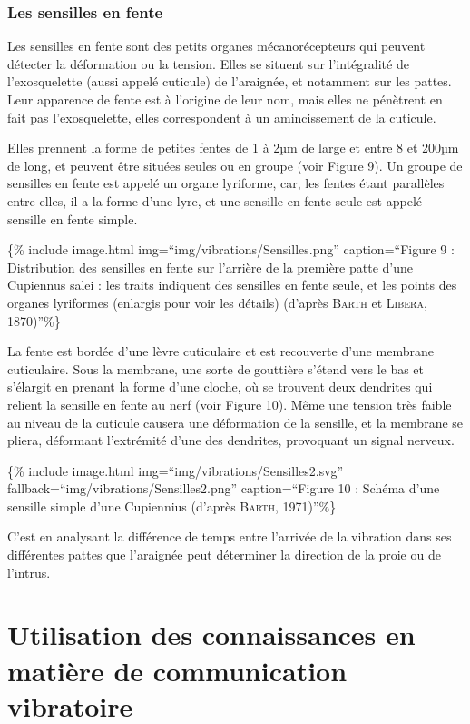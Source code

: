 \subsubsection{Les sensilles en fente}\label{les-sensilles-en-fente}

Les sensilles en fente sont des petits organes mécanorécepteurs qui
peuvent détecter la déformation ou la tension. Elles se situent sur
l'intégralité de l'exosquelette (aussi appelé cuticule) de l'araignée,
et notamment sur les pattes. Leur apparence de fente est à l'origine de
leur nom, mais elles ne pénètrent en fait pas l'exosquelette, elles
correspondent à un amincissement de la cuticule.

Elles prennent la forme de petites fentes de 1 à 2µm de large et entre 8
et 200µm de long, et peuvent être situées seules ou en groupe (voir
Figure 9). Un groupe de sensilles en fente est appelé un organe
lyriforme, car, les fentes étant parallèles entre elles, il a la forme
d'une lyre, et une sensille en fente seule est appelé sensille en fente
simple.

\{\% include image.html img=``img/vibrations/Sensilles.png''
caption=``Figure 9 : Distribution des sensilles en fente sur l'arrière
de la première patte d'une Cupiennus salei : les traits indiquent des
sensilles en fente seule, et les points des organes lyriformes (enlargis
pour voir les détails) (d'après \textsc{Barth} et \textsc{Libera},
1870)''\%\}

La fente est bordée d'une lèvre cuticulaire et est recouverte d'une
membrane cuticulaire. Sous la membrane, une sorte de gouttière s'étend
vers le bas et s'élargit en prenant la forme d'une cloche, où se
trouvent deux dendrites qui relient la sensille en fente au nerf (voir
Figure 10). Même une tension très faible au niveau de la cuticule
causera une déformation de la sensille, et la membrane se pliera,
déformant l'extrémité d'une des dendrites, provoquant un signal nerveux.

\{\% include image.html img=``img/vibrations/Sensilles2.svg''
fallback=``img/vibrations/Sensilles2.png'' caption=``Figure 10 : Schéma
d'une sensille simple d'une Cupiennius (d'après \textsc{Barth},
1971)''\%\}

C'est en analysant la différence de temps entre l'arrivée de la
vibration dans ses différentes pattes que l'araignée peut déterminer la
direction de la proie ou de l'intrus.

\section{Utilisation des connaissances en matière de communication
vibratoire}\label{utilisation-des-connaissances-en-matiuxe8re-de-communication-vibratoire}

